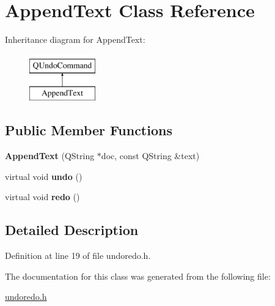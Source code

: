 \hypertarget{class_append_text}{}\section{Append\+Text Class Reference}
\label{class_append_text}
Inheritance diagram for Append\+Text\+:\begin{figure}[H]
\begin{center}
\leavevmode
\includegraphics[height=2.000000cm]{class_append_text}
\end{center}
\end{figure}
\subsection*{Public Member Functions}
\begin{DoxyCompactItemize}
\item 
\mbox{\label{class_append_text_a1f053473808df00e83d26566b5be19cd}} 
{\bfseries Append\+Text} (Q\+String $\ast$doc, const Q\+String \&text)
\item 
\mbox{\label{class_append_text_a9289ddb9645f35cc98e05e77d96ca093}} 
virtual void {\bfseries undo} ()
\item 
\mbox{\label{class_append_text_a552142d5909b416eadbb4f6f728cb9d6}} 
virtual void {\bfseries redo} ()
\end{DoxyCompactItemize}


\subsection{Detailed Description}


Definition at line 19 of file undoredo.\+h.



The documentation for this class was generated from the following file\+:\begin{DoxyCompactItemize}
\item 
\hyperlink{undoredo_8h}{undoredo.\+h}\end{DoxyCompactItemize}
